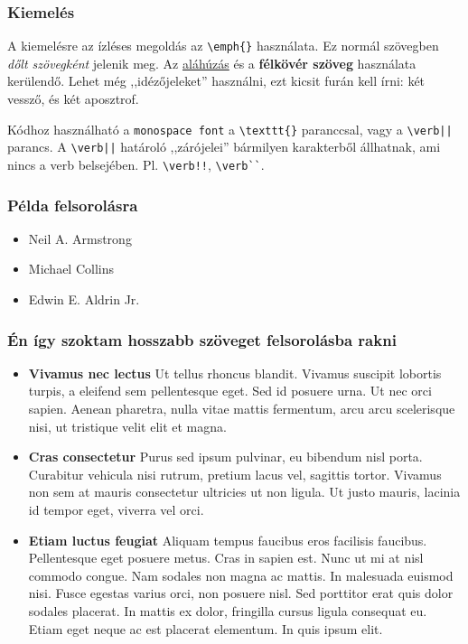 \documentclass[12pt]{article}
\begin{document}
\subsubsection*{Kiemelés}
A kiemelésre az ízléses megoldás az \verb|\emph{}| használata. Ez normál szövegben \emph{dőlt szövegként} jelenik meg. Az \underline{aláhúzás} és a \textbf{félkövér szöveg} használata kerülendő. Lehet még ,,idézőjeleket'' használni, ezt kicsit furán kell írni: két vessző, és két aposztrof.

Kódhoz használható a \texttt{monospace font} a \verb|\texttt{}| paranccsal, vagy a \verb!\verb||! parancs. A \verb!\verb||! határoló ,,zárójelei'' bármilyen karakterből állhatnak, ami nincs a verb belsejében. Pl. \verb|\verb!!|, \verb|\verb``|.

\subsubsection*{Példa felsorolásra}
\begin{itemize}
  \item Neil A. Armstrong
  \item Michael Collins
  \item Edwin E. Aldrin Jr.
\end{itemize}

\subsubsection*{Én így szoktam hosszabb szöveget felsorolásba rakni}
\begin{itemize}
  \item \textbf{Vivamus nec lectus} Ut tellus rhoncus blandit. Vivamus suscipit lobortis turpis, a eleifend sem pellentesque eget. Sed id posuere urna. Ut nec orci sapien. Aenean pharetra, nulla vitae mattis fermentum, arcu arcu scelerisque nisi, ut tristique velit elit et magna.
  \item \textbf{Cras consectetur} Purus sed ipsum pulvinar, eu bibendum nisl porta. Curabitur vehicula nisi rutrum, pretium lacus vel, sagittis tortor. Vivamus non sem at mauris consectetur ultricies ut non ligula. Ut justo mauris, lacinia id tempor eget, viverra vel orci.
  \item \textbf{Etiam luctus feugiat} Aliquam tempus faucibus eros facilisis faucibus. Pellentesque eget posuere metus. Cras in sapien est. Nunc ut mi at nisl commodo congue. Nam sodales non magna ac mattis. In malesuada euismod nisi. Fusce egestas varius orci, non posuere nisl. Sed porttitor erat quis dolor sodales placerat. In mattis ex dolor, fringilla cursus ligula consequat eu. Etiam eget neque ac est placerat elementum. In quis ipsum elit. 
\end{itemize}
\end{document}
